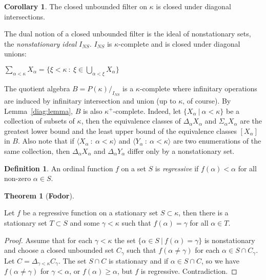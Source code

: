 \documentclass[8pt]{article}
\theoremstyle{definition}
\newtheorem{definition}{Definition}[section]
\theoremstyle{definition}
\newtheorem{theorem}{Theorem}[section]
\theoremstyle{definition}
\theoremstyle{definition}
\theoremstyle{definition}
\theoremstyle{definition}
\theoremstyle{definition}
\theoremstyle{definition}
\theoremstyle{definition}
\theoremstyle{definition}
\theoremstyle{definition}
\theoremstyle{definition}
\theoremstyle{definition}
\theoremstyle{definition}
\newtheorem{col}{Corollary}[section]
\theoremstyle{question}
\begin{document}
\begin{col}
  The closed unbounded filter on $\kappa$ is closed under diagonal intersections.
\end{col}

The dual notion of a closed unbounded filter is the ideal of nonstationary sets, the \emph{nonstationary ideal} $I_{NS}$.
$I_{NS}$ is $\kappa$-complete and is closed under diagonal unions:
\begin{center}
  $\sum \limits_{\alpha < \kappa} X_{\alpha} = \{ \xi < \kappa \: : \: \xi \in \bigcup \limits_{\alpha < \xi} X_{\alpha} \}$
\end{center}

The quotient algebra $B = P(\kappa)/_{I_{NS}}$ is a $\kappa$-complete where infinitary operations are induced
by infinitary intersection and union (up to $\kappa$, of course). By Lemma~\ref{diag:lemma}, $B$ is also $\kappa^+$-complete.
Indeed, let $\{ X_{\alpha} \: | \: \alpha < \kappa \}$ be a collection of subsets of $\kappa$, then the equivalence
classes of $\Delta_{\alpha} X_{\alpha}$ and $\Sigma_{\alpha} X_{\alpha}$ are the greatest lower bound and the 
least upper bound of the equivalence classes $[X_{\alpha}]$ in $B$. Also note that if $\langle X_{\alpha} \: : 
\: \alpha < \kappa \rangle$ and $\langle Y_{\alpha} \: : \: \alpha < \kappa \rangle$ are two enumerations of the same collection,
then $\Delta_{\alpha} X_{\alpha}$ and $\Delta_{\alpha} Y_{\alpha}$ differ only by a nonstationary set.

\begin{definition}
  An ordinal function $f$ on a set $S$ is \emph{regressive} if $f(\alpha) < \alpha$ for all non-zero $\alpha \in S$.
\end{definition}

\begin{theorem}[\bf Fodor]~\label{fodor}

  Let $f$ be a regressive function on a stationary set $S \subset \kappa$, then there is a stationary set
  $T \subset S$ and some $\gamma < \kappa$ such that $f(\alpha) = \gamma$ for all $\alpha \in T$.
\end{theorem}

\begin{proof}
  Assume that for each $\gamma < \kappa$ the set $\{ \alpha \in S \: | \: f(\alpha) = \gamma \}$
  is nonstationary and choose a closed unbounded set $C_{\gamma}$ such that $f(\alpha \neq \gamma)$
  for each $\alpha \in S \cap C_{\gamma}$. Let $C = \Delta_{\gamma < \kappa} C_{\gamma}$.
  The set $S \cap C$ is stationary and if $\alpha \in S \cap C$, so we have $f(\alpha \neq \gamma)$
  for $\gamma < \alpha$, or $f(\alpha) \geq \alpha$, but $f$ is regressive. Contradiction.
\end{proof}
\end{document}
